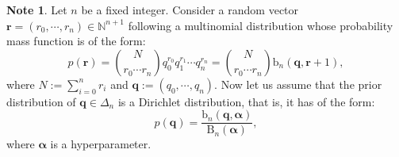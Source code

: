 \documentclass[12pt, a4paper]{amsart}
\theoremstyle{plain}
\theoremstyle{definition}
\newtheorem{Note}[thm]{Note}
\numberwithin{figure}{section}
\numberwithin{table}{section}
\numberwithin{equation}{section}
\begin{document}
\begin{Note}
\label{Note:conjugatePrior}
Let $n$ be a fixed integer.
Consider a random vector
$
\mathbf{r}
	=
(r_0, \cdots, r_n)
	\in
\mathbb{N}^{n+1}
$
following
a multinomial distribution
whose probability mass function is of the form:
\begin{equation}
\label{eq:multiNomialMassF}
p(\mathbf{r})
	=
\binom{N}{r_0 \cdots r_n}
q_0^{r_0}
q_1^{r_1}
	\cdots
q_n^{r_n}
	=
\binom{N}{r_0 \cdots r_n}
\mathrm{b}_n(
	\mathbf{q},
	\mathbf{r} + 1
),
\end{equation}
where
$
N
	:=
\sum_{i=0}^n r_i 
$
and
$
\mathbf{q}
	:=
(q_0, \cdots, q_n)
$.
%
Now let us assume that the prior distribution of
$
\mathbf{q}
	\in
\Delta_n
$
is a Dirichlet distribution, that is, it has of the form:
\begin{equation}
\label{eq:priorDistM}
p(\mathbf{q})
	=
\frac{
	\mathrm{b}_n(\mathbf{q}, 
		\boldsymbol{\alpha}
	)
}{
	\mathrm{B}_n(
		\boldsymbol{\alpha}
	)
} ,
\end{equation}
where 
$
		\boldsymbol{\alpha}
$
is a hyperparameter.


\end{Note}
\end{document}
